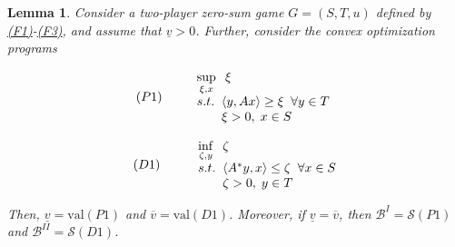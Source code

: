 \documentclass[11pt, twoside]{article}
\numberwithin{equation}{section}
\newtheorem{lemma}{Lemma}[section]
\theoremstyle{definition}
\begin{document}
\begin{lemma}\label{lem:securitylevels}
    Consider a two-player zero-sum game $G=(S,T,u)$ defined by \hyperlink{f1}{(F1)}-\hyperlink{f3}{(F3)}, and assume that $\underline{v}>0$. Further, consider the convex optimization programs \hypertarget{p1}{}
\begin{center}
\vspace*{-0.9cm}\begin{equation*}{(P1)\;\;\;\;\;\;\;\;}
\begin{array}{ll}
    \sup\limits_{\xi,x}\;\; \xi\\
     \textup{s.t.}\;\;\langle y,Ax\rangle\geq\xi\;\;\forall y\in T\\ \;\;\;\;\;\;\;\xi>0,\;x\in S
    \end{array}
\end{equation*}
\end{center}
\begin{center}\hypertarget{d1}{}
\vspace{-0.7cm}\begin{equation*}{\;(D1)\;\;\;\;\;\;\;\;\;}
\begin{array}{ll}
    \inf\limits_{\zeta,y}\;\; \zeta\\
     \textup{s.t.}\;\; \langle A^*y,x\rangle\leq\zeta\;\;\forall x\in S \\ \;\;\;\;\;\;\;\zeta>0,\;y\in T
    \end{array}
\end{equation*}
\end{center}
Then, $\underline{v}=\text{val}(P1)$ and $\overline{v}=\text{val}(D1)$. Moreover, if $\underline{v}=\overline{v}$, then $\mathcal{B}^{I}=\mathcal{S}(P1)$ and $\mathcal{B}^{II}=\mathcal{S}(D1)$.
\end{lemma}
\end{document}
